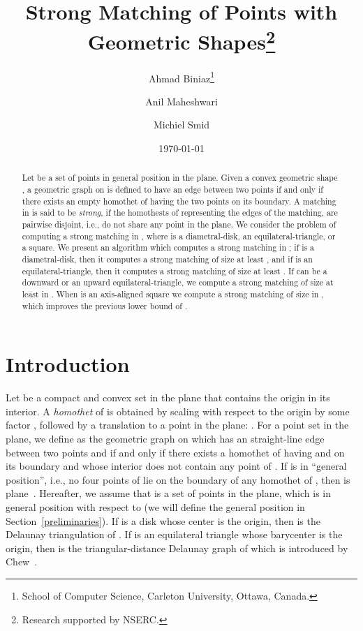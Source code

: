 \documentclass[11pt,a4paper]{article}
\title{Strong Matching of Points with Geometric Shapes\thanks{Research supported by NSERC.}}
\author{
Ahmad Biniaz\thanks{School of Computer Science, Carleton University, Ottawa, Canada.}
\and 
Anil Maheshwari\footnotemark[2]
\and 
Michiel Smid\footnotemark[2]
}
\date{\today}
\begin{document}
\maketitle

\begin{abstract}
Let  be a set of  points in general position in the plane. Given a convex geometric shape , a geometric graph  on  is defined to have an edge between two points if and only if there exists an empty homothet of  having the two points on its boundary. A matching in  is said to be {\em strong}, if the homothests of  representing the edges of the matching, are pairwise disjoint, i.e., do not share any point in the plane. We consider the problem of computing a strong matching in , where  is a diametral-disk, an equilateral-triangle, or a square. We present an algorithm which computes a strong matching in ; if  is a diametral-disk, then it computes a strong matching of size at least , and if  is an equilateral-triangle, then it computes a strong matching of size at least . If  can be a downward or an upward equilateral-triangle, we compute a strong matching of size at least  in . When  is an axis-aligned square we compute a strong matching of size  in , which improves the previous lower bound of . 
\end{abstract}

\section{Introduction}
\label{intro}

Let  be a compact and convex set in the plane that contains the origin in its interior. A {\em homothet} of  is obtained by scaling  with respect to the origin by some factor , followed by a translation to a point  in the plane: .
For a point set  in the plane, we define  as the geometric graph on  which has an straight-line edge between two points  and  if and only if there exists a homothet of  having  and  on its boundary and whose interior does not contain any point of . If  is in ``general position'', i.e., no four points of  lie on the boundary of any homothet of , then  is plane~\cite{Bose2010}. Hereafter, we assume that  is a set of  points in the plane, which is in general position with respect to  (we will define the general position in Section~\ref{preliminaries}). 
If  is a disk  whose center is the origin, then  is the Delaunay triangulation of . If  is an equilateral triangle  whose barycenter is the origin, then  is the triangular-distance Delaunay graph of  which is introduced by Chew~\cite{Chew1989}.
\end{document}
